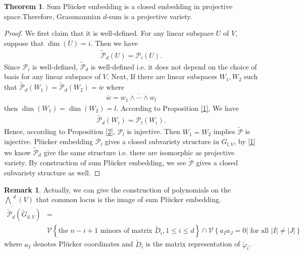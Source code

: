 \documentclass[10pt,UTF8]{article}
\theoremstyle{definition}
\renewcommand{\qed}{\rightline{$\qedsymbol$}}
\newtheorem{theorem}[definition]{Theorem}
\newtheorem*{remark}{Remark}
\newtheorem*{proof}{Proof}
\begin{document}
\begin{theorem}
  Sum Plücker embedding is a closed embedding in projective space.Therefore, Grassmannian $d$-sum is a projective variety.
\end{theorem}
\begin{proof}
  We first claim that it is well-defined.
  For any linear subspace $U$ of $V$, suppose that $\dim(U) = i$. Then we have
  \begin{align*}
    \tilde{\mathcal{P}}_d(U) =\mathcal{P}_i(U).
  \end{align*}
  Since $\mathcal{P}_i$ is well-defined, $\tilde{\mathcal{P}}_d$ is well-defined i.e. it does not depend on the choice of basis for any linear subspace of $V$.
  Next, If there are linear subspaces $W_1,W_2$ such that $\tilde{\mathcal{P}}_d(W_1)=\tilde{\mathcal{P}}_d(W_2)= \overline{w}$ where  
  \begin{align*}
    \overline{w} = \overline{ w_1\wedge\cdots \wedge w_{l}}
  \end{align*}
  then $\dim(W_1)=\dim(W_2)= l$. According to Proposition \ref{1}, We have
  \begin{align*}
    \tilde{\mathcal{P}}_d(W_i) =\mathcal{P}_l(W_i).
  \end{align*}
  Hence, according to Proposition \ref{2}, $\mathcal{P}_l$ is injective. Then $W_1=W_2$ implies $\tilde{\mathcal{P}}$ is injective.
  Plücker embedding $\mathcal{P}_l $ gives a closed subvariety structure in ${G}_{l,V}$, by \ref{1} we know $\tilde{\mathcal{P}}_d$ give the same structure i.e. there are isomorphic as projective variety.
  By construction of sum Plücker embedding, we see $\tilde{\mathcal{P}}$ gives a closed subvariety structure as well.

  \qed
\end{proof}


\begin{remark}
  Actually, we can give the construction of polynomials on the ${\underline{\bigwedge}^{d}}(V)$ that common locus is the image of sum Plücker embedding.
  \begin{align*}
    \tilde{\mathcal{P}}_d(\tilde{G}_{d,V}) &=\\ &\mathcal{V}\left\{ \text{the $n-i+1$ minors of matrix $\tilde{D}_i,1 \le i \le d$}  \right\}
    \cap \mathcal{V}\left\{ \text{$a_Ia_J=0 |$ for all $|I|\neq |J|$}  \right\}
  \end{align*}
  where $a_I$ denotes Plücker coordinates and $\tilde{D}_i$ is the matrix representation of $\tilde{\varphi}_i$.
\end{remark}
\end{document}
